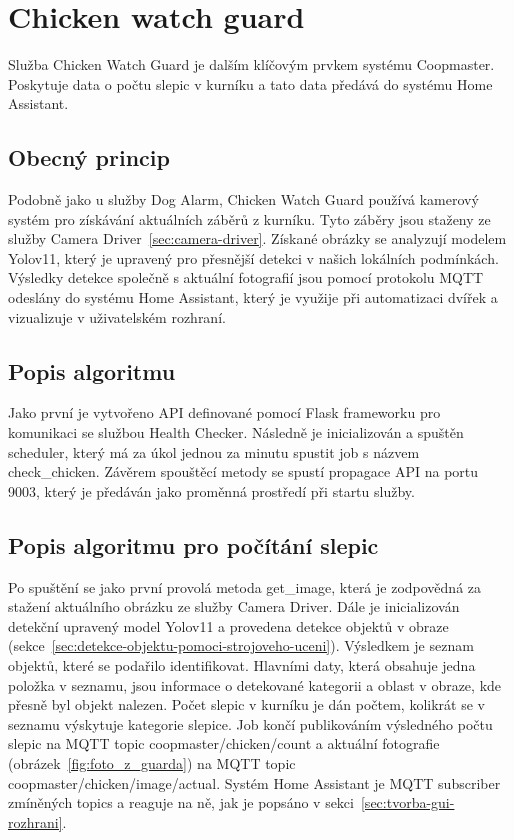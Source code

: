 \section{Chicken watch guard}\label{sec:chicken-watch-guard}
Služba Chicken Watch Guard je dalším klíčovým prvkem systému Coopmaster.
Poskytuje data o počtu slepic v kurníku a tato data předává do systému Home Assistant.\newline

\subsection*{Obecný princip}
Podobně jako u služby Dog Alarm, Chicken Watch Guard používá kamerový systém pro získávání aktuálních záběrů z kurníku.
Tyto záběry jsou staženy ze služby Camera Driver~\ref{sec:camera-driver}.
Získané obrázky se analyzují modelem Yolov11, který je upravený pro přesnější detekci v našich lokálních podmínkách.
Výsledky detekce společně s aktuální fotografií jsou pomocí protokolu MQTT odeslány do systému Home Assistant, který je využije při automatizaci dvířek a vizualizuje v uživatelském rozhraní.

\subsection*{Popis algoritmu}
Jako první je vytvořeno API definované pomocí Flask frameworku pro komunikaci se službou Health Checker.
Následně je inicializován a spuštěn scheduler, který má za úkol jednou za minutu spustit job s názvem check\_chicken.
Závěrem spouštěcí metody se spustí propagace API na portu 9003, který je předáván jako proměnná prostředí při startu služby.

\subsection*{Popis algoritmu pro počítání slepic}
Po spuštění se jako první provolá metoda get\_image, která je zodpovědná za stažení aktuálního obrázku ze služby Camera Driver.
Dále je inicializován detekční upravený model Yolov11 a provedena detekce objektů v obraze (sekce~\ref{sec:detekce-objektu-pomoci-strojoveho-uceni}).
Výsledkem je seznam objektů, které se podařilo identifikovat.
Hlavními daty, která obsahuje jedna položka v seznamu, jsou informace o detekované kategorii a oblast v obraze, kde přesně byl objekt nalezen.
Počet slepic v kurníku je dán počtem, kolikrát se v seznamu výskytuje kategorie slepice.
Job končí publikováním výsledného počtu slepic na MQTT topic coopmaster/chicken/count
 a aktuální fotografie (obrázek~\ref{fig:foto_z_guarda}) na MQTT topic coopmaster/chicken/image/actual.
Systém Home Assistant je MQTT subscriber zmíněných topics a reaguje na ně, jak je popsáno v sekci~\ref{sec:tvorba-gui-rozhrani}.

